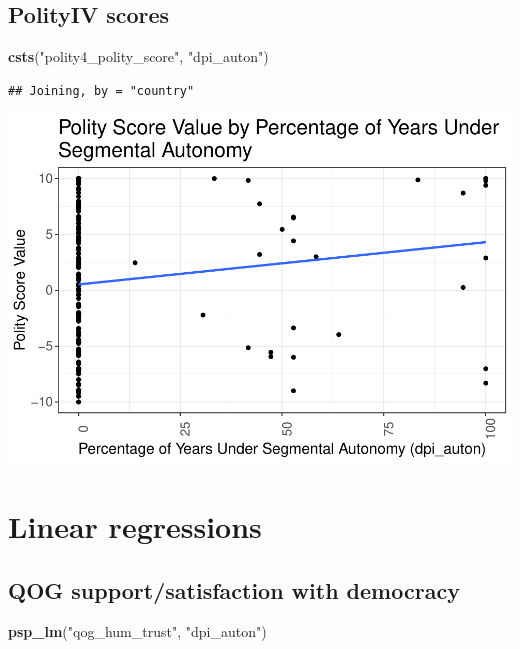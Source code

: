 \documentclass[
]{article}
\newenvironment{Shaded}{\begin{snugshade}}{\end{snugshade}}
\newcommand{\KeywordTok}[1]{\textcolor[rgb]{0.13,0.29,0.53}{\textbf{#1}}}
\newcommand{\NormalTok}[1]{#1}
\newcommand{\StringTok}[1]{\textcolor[rgb]{0.31,0.60,0.02}{#1}}
\begin{document}
\hypertarget{polityiv-scores}{%
\subsection{PolityIV scores}\label{polityiv-scores}}

\begin{Shaded}
\begin{Highlighting}[]
\KeywordTok{csts}\NormalTok{(}\StringTok{"polity4_polity_score"}\NormalTok{, }\StringTok{"dpi_auton"}\NormalTok{)}
\end{Highlighting}
\end{Shaded}

\begin{verbatim}
## Joining, by = "country"
\end{verbatim}

\includegraphics{03_tjbrailey_data_analysis_files/figure-latex/unnamed-chunk-4-1.pdf}

\hypertarget{linear-regressions}{%
\section{Linear regressions}\label{linear-regressions}}

\hypertarget{qog-supportsatisfaction-with-democracy-1}{%
\subsection{QOG support/satisfaction with
democracy}\label{qog-supportsatisfaction-with-democracy-1}}

\begin{Shaded}
\begin{Highlighting}[]
\KeywordTok{psp_lm}\NormalTok{(}\StringTok{"qog_hum_trust"}\NormalTok{, }\StringTok{"dpi_auton"}\NormalTok{)}
\end{Highlighting}
\end{Shaded}
\end{document}
